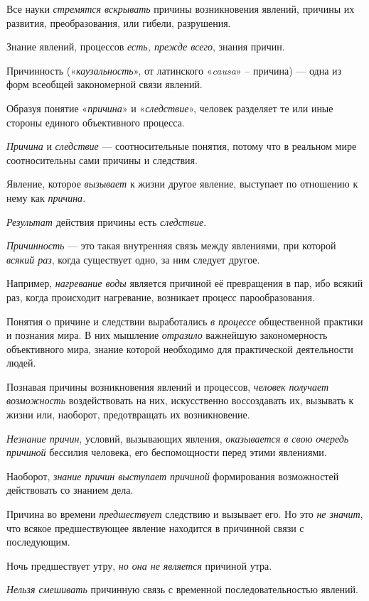 \documentclass[a4paper,14pt,russian]{extreport}
\begin{document}
Все науки \emph{стремятся вскрывать} причины возникновения явлений, причины их развития, преобразования, или гибели, разрушения.

Знание явлений, процессов \emph{есть, прежде всего}, знания причин.

Причинность («\emph{каузальность}», от латинского «\emph{causa}» -- причина) --- одна из форм всеобщей закономерной связи явлений.

Образуя понятие «\emph{причина}» и «\emph{следствие}», человек разделяет те или иные стороны единого объективного процесса.

\emph{Причина} и \emph{следствие} --- соотносительные понятия, потому что в реальном мире соотносительны сами причины и следствия.

Явление, которое \emph{вызывает} к жизни другое явление, выступает по отношению к нему как \emph{причина}.

\emph{Результат} действия причины есть \emph{следствие}.

\emph{Причинность} --- это такая внутренняя связь между явлениями, при которой \emph{всякий раз}, когда существует одно, за ним следует другое.

Например, \emph{нагревание воды} является причиной её превращения в пар, ибо всякий раз, когда происходит нагревание, возникает процесс парообразования.

Понятия о причине и следствии выработались \emph{в процессе} общественной практики и познания мира. В них мышление \emph{отразило} важнейшую закономерность объективного мира, знание которой необходимо для практической деятельности людей.

Познавая причины возникновения явлений и процессов, \emph{человек получает возможность} воздействовать на них, искусственно воссоздавать их, вызывать к жизни или, наоборот, предотвращать их возникновение.

\emph{Незнание причин}, условий, вызывающих явления, \emph{оказывается в свою очередь причиной} бессилия человека, его беспомощности перед этими явлениями.

Наоборот, \emph{знание причин выступает причиной} формирования возможностей действовать со знанием дела.

Причина во времени \emph{предшествует} следствию и вызывает его. Но это \emph{не значит}, что всякое предшествующее явление находится в причинной связи с последующим.

Ночь предшествует утру, \emph{но она не является} причиной утра.

\emph{Нельзя смешивать} причинную связь с временной последовательностью явлений.
\end{document}
